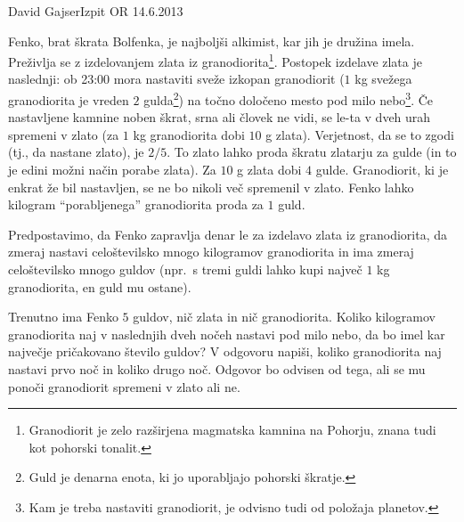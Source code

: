 \begin{naloga}{David Gajser}{Izpit OR 14.6.2013}
\begin{vprasanje}
Fenko, brat škrata Bolfenka, je najboljši alkimist, kar jih je družina imela.
Preživlja se z izdelovanjem zlata iz granodiorita\footnote{
Granodiorit je zelo razširjena magmatska kamnina na Pohorju,
znana tudi kot pohorski tonalit.
}.
Postopek izdelave zlata je naslednji:
ob 23:00 mora nastaviti sveže izkopan granodiorit
($1$ kg svežega granodiorita je vreden $2$ gulda\footnote{
Guld je denarna enota, ki jo uporabljajo pohorski škratje.
})
na točno določeno mesto pod milo nebo\footnote{
Kam je treba nastaviti granodiorit, je odvisno tudi od položaja planetov.
}.
Če nastavljene kamnine noben škrat, srna ali človek ne vidi,
se le-ta v dveh urah spremeni v zlato
(za $1$ kg granodiorita dobi $10$ g zlata).
Verjetnost, da se to zgodi (tj., da nastane zlato), je $2/5$.
To zlato lahko proda škratu zlatarju za gulde
(in to je edini možni način porabe zlata).
Za $10$ g zlata dobi $4$ gulde.
Granodiorit, ki je enkrat že bil nastavljen,
se ne bo nikoli več spremenil v zlato.
Fenko lahko kilogram ``porabljenega'' granodiorita proda za $1$ guld.

Predpostavimo, da Fenko zapravlja denar le za izdelavo zlata iz granodiorita,
da zmeraj nastavi celoštevilsko mnogo kilogramov granodiorita
in ima zmeraj celoštevilsko mnogo guldov
(npr.~s tremi guldi lahko kupi največ $1$ kg granodiorita, en guld mu ostane).

Trenutno ima Fenko $5$ guldov, nič zlata in nič granodiorita.
Koliko kilogramov granodiorita
naj v naslednjih dveh nočeh nastavi pod milo nebo,
da bo imel kar največje pričakovano število guldov?
V odgovoru napiši,
koliko granodiorita naj nastavi prvo noč in koliko drugo noč.
Odgovor bo odvisen od tega,
ali se mu ponoči granodiorit spremeni v zlato ali ne.
\end{vprasanje}
\begin{odgovor}
\begin{slika}
\makebox[\textwidth][c]{
\pgfslika
}
\end{slika}
\end{odgovor}
\end{naloga}
